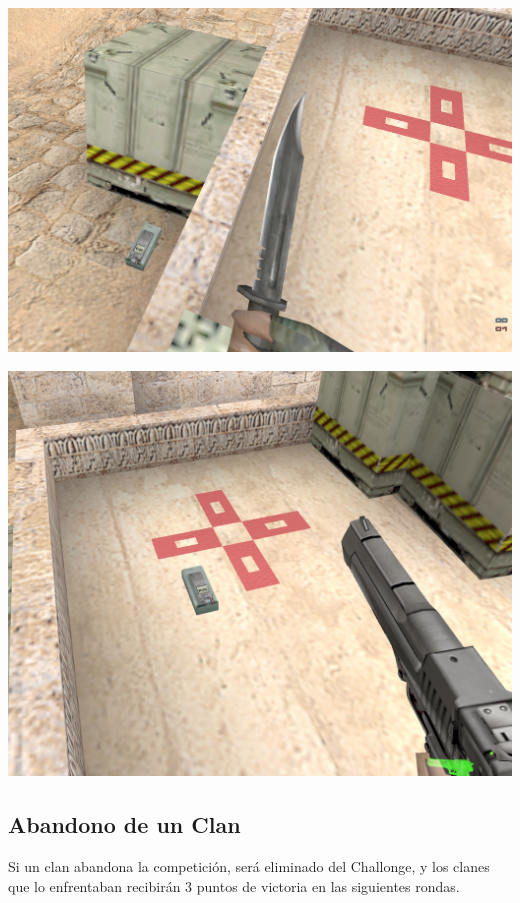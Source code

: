 \documentclass[a4paper, 11pt]{article}
\begin{document}
    \begin{minipage}{0.40\textwidth}
        \centering
        \includegraphics[width=\textwidth]{img/c4_bug.png}
    \end{minipage}
    \hspace{0.05\textwidth}
    \begin{minipage}{0.45\textwidth}
        \centering
        \includegraphics[width=\textwidth]{img/c4_nobug.png}
    \end{minipage}

    \subsection{Abandono de un Clan}
    Si un clan abandona la competición, será eliminado del Challonge, y los clanes que lo enfrentaban recibirán 3 puntos de victoria en las siguientes rondas.
\end{document}
